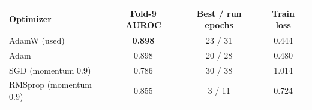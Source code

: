 \begin{tabular}{@{}lccc@{}}
\toprule
Optimizer & Fold-9 AUROC & Best / run epochs & Train loss \\
\midrule
AdamW (used) & \textbf{0.898} & 23 / 31 & 0.444 \\
Adam \cite{kingma2015adam} & 0.898 & 20 / 28 & 0.480 \\
SGD (momentum 0.9) & 0.786 & 30 / 38 & 1.014 \\
RMSprop (momentum 0.9) & 0.855 & 3 / 11 & 0.724 \\
\bottomrule
\end{tabular}
